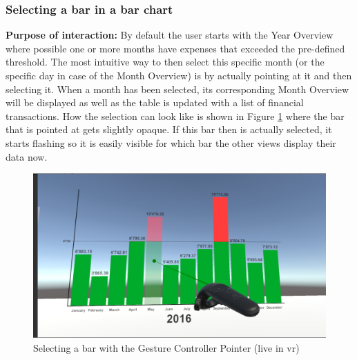 \subsubsection{Selecting a bar in a bar chart}

\textbf{Purpose of interaction:} By default the user starts with the Year Overview where possible  one or more months have expenses that exceeded the pre-defined threshold. The most intuitive way to then select this specific month (or the specific day in case of the Month Overview) is by actually pointing at it and then selecting it. When a month has been selected, its corresponding Month Overview will be displayed as well as the table is updated with a list of financial transactions. How the selection can look like is shown in Figure \ref{fig:unitybarselection} where the bar that is pointed at gets slightly opaque. If this bar then is actually selected, it starts flashing so it is easily visible for which bar the other views display their data now.
\begin{figure}[h]
	\begin{center}
		\includegraphics[width=12cm]{03_Figures/08_Development/Bar_Selection.png}
		\caption{Selecting a bar with the Gesture Controller Pointer (live in \gls{vr})}
		\label{fig:unitybarselection}
	\end{center}
\end{figure}


